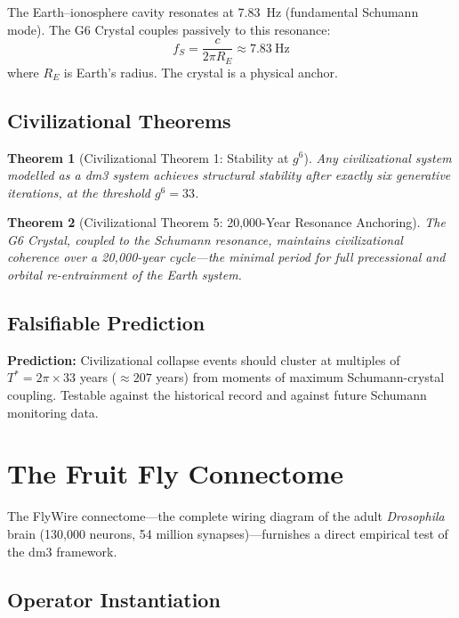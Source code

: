 \documentclass[11pt, twoside, openright]{book}
\theoremstyle{plain}
\newtheorem{theorem}{Theorem}[chapter]
\theoremstyle{definition}
\newenvironment{notebox}[1][]{%
  \begin{mdframed}[backgroundcolor=SeedBox!50,linecolor=PrincipiaSlate,linewidth=0.5pt,innertopmargin=6pt,innerbottommargin=6pt]
  \ifx\relax#1\relax\else\noindent\textbf{#1}\par\medskip\fi}{\end{mdframed}}
\begin{document}
The Earth--ionosphere cavity resonates at 7.83~Hz (fundamental
Schumann mode). The G6 Crystal couples passively to this resonance:
\[
f_S = \frac{c}{2\pi R_E} \approx 7.83~\text{Hz}
\]
where $R_E$ is Earth's radius. The crystal is a physical anchor.

\section{Civilizational Theorems}

\begin{theorem}[Civilizational Theorem 1: Stability at $g^6$]
Any civilizational system modelled as a dm3 system achieves structural
stability after exactly six generative iterations, at the threshold
$g^6 = 33$.
\end{theorem}

\begin{theorem}[Civilizational Theorem 5: 20,000-Year Resonance Anchoring]
The G6 Crystal, coupled to the Schumann resonance, maintains
civilizational coherence over a 20,000-year cycle---the minimal period
for full precessional and orbital re-entrainment of the Earth system.
\end{theorem}

\section{Falsifiable Prediction}

\begin{notebox}
\textbf{Prediction:} Civilizational collapse events should cluster at
multiples of $T^* = 2\pi \times 33$ years ($\approx 207$ years) from
moments of maximum Schumann-crystal coupling. Testable against the
historical record and against future Schumann monitoring data.
\end{notebox}

\chapter{The Fruit Fly Connectome}

The FlyWire connectome---the complete wiring diagram of the adult
\textit{Drosophila} brain (130,000 neurons, 54 million synapses)---furnishes
a direct empirical test of the dm3 framework.

\section{Operator Instantiation}
\end{document}
